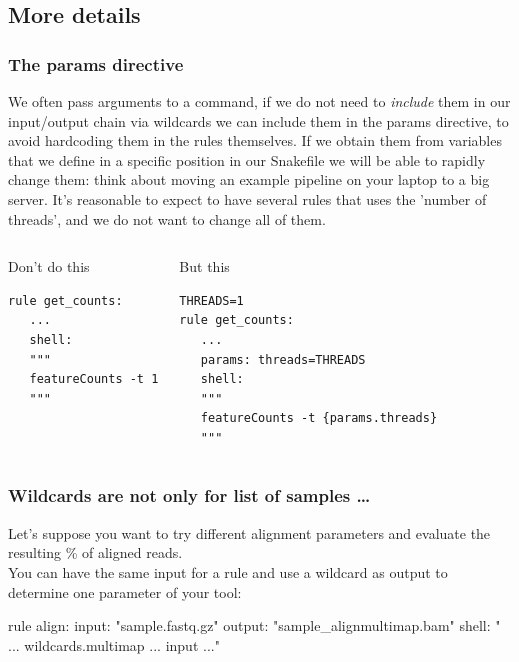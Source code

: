 \documentclass[xcolor=table]{beamer}
\begin{document}
\subsection{More details}
\begin{frame}[fragile]
\frametitle{The params directive}
\begin{footnotesize}
We often pass arguments to a command, if we do not need to \emph{include} them in our input/output chain via wildcards we can include them in the params directive, to avoid
\textcolor{beer}{hardcoding} them in the rules themselves. If we obtain them from variables that we define in a specific position in our Snakefile we will be able to rapidly change them: think about
moving an example pipeline on your laptop to a big server. It's reasonable to expect to have several rules that uses the 'number of threads', and we do not want to change all of them.
\end{footnotesize}

\begin{columns}
\begin{beamerboxesrounded}[upper=upper_box,lower=lower_box,shadow=true]{Don't do this}
\begin{lstlisting}[basicstyle=\tiny]
rule get_counts:
   ...
   shell: 
   """
   featureCounts -t 1
   """
\end{lstlisting}
\end{beamerboxesrounded}

\begin{beamerboxesrounded}[upper=upper_box2,lower=lower_box,shadow=true]{But this}
\begin{lstlisting}[basicstyle=\tiny]
THREADS=1
rule get_counts:
   ...
   params: threads=THREADS
   shell: 
   """
   featureCounts -t {params.threads}
   """
\end{lstlisting}
\end{beamerboxesrounded}
\end{columns}
\end{frame}

\begin{frame}[fragile]
\frametitle{Wildcards are not only for list of samples \ldots}

Let's suppose you want to try different \textcolor{beer}{alignment parameters} and evaluate the resulting \% of aligned reads. \\
You can have the same input for a rule and use a wildcard as output to determine one parameter of your tool:
\begin{python}[basicstyle=\tiny]
rule align:
   input: "{sample}.fastq.gz"
   output: "{sample}_align{multimap}.bam"
   shell: " ... {wildcards.multimap} ...  {input} ..."
\end{python}

\end{frame}
\end{document}
